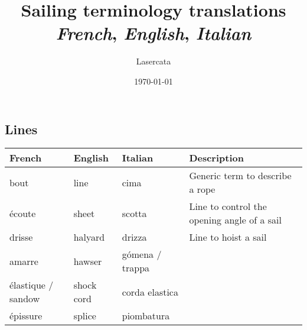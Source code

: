 \documentclass[a4paper, 12pt, twoside]{article}
\title{Sailing terminology translations \\ \textit{French}, \textit{English}, \textit{Italian}}
\author{Lasercata}
\date{\today}
\begin{document}
    
    \maketitle
    
    \tableofcontents
    \newpage
    
    \begin{indt}{\section{Lines}}%
        \begin{tabular}{|l|l|l||p{150pt}|}
            \hline %
            \textbf{French}
            & \textbf{English}
            & \textbf{Italian}
            & \textbf{Description}
            \\
            \hline
            \hline %
            bout %
            & line
            & cima
            & Generic term to describe a rope
            \\
            \hline %
            écoute %
            & sheet
            & scotta
            & Line to control the opening angle of a sail
            \\
            \hline %
            drisse %
            & halyard
            & drizza
            & Line to hoist a sail
            \\
            \hline %
            amarre %
            & hawser
            & gómena / trappa
            &
            \\
            \hline %
            élastique / sandow %
            & shock cord
            & corda elastica
            &
            \\
            \hline %
            épissure %
            & splice
            & piombatura
            \\
            \hline %
        \end{tabular}
    \end{indt}%
\end{document}
